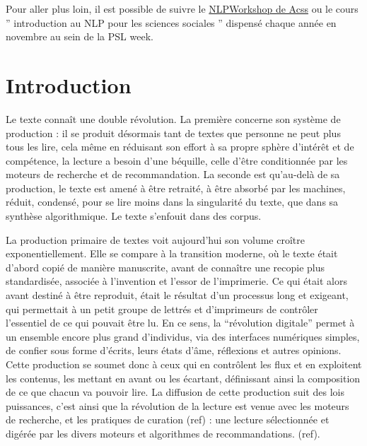 \documentclass[
  letterpaper,
  DIV=11,
  numbers=noendperiod]{scrreprt}
\begin{document}
Pour aller plus loin, il est possible de suivre le
\href{https://acss-dig.psl.eu/fr/seminaires/nlp}{NLPWorkshop de Acss} ou
le cours '' introduction au NLP pour les sciences sociales '' dispensé
chaque année en novembre au sein de la PSL week.


\chapter{Introduction}\label{introduction}

Le texte connaît une double révolution. La première concerne son système
de production : il se produit désormais tant de textes que personne ne
peut plus tous les lire, cela même en réduisant son effort à sa propre
sphère d'intérêt et de compétence, la lecture a besoin d'une béquille,
celle d'être conditionnée par les moteurs de recherche et de
recommandation. La seconde est qu'au-delà de sa production, le texte est
amené à être retraité, à être absorbé par les machines, réduit,
condensé, pour se lire moins dans la singularité du texte, que dans sa
synthèse algorithmique. Le texte s'enfouit dans des corpus.

La production primaire de textes voit aujourd'hui son volume croître
exponentiellement. Elle se compare à la transition moderne, où le texte
était d'abord copié de manière manuscrite, avant de connaître une
recopie plus standardisée, associée à l'invention et l'essor de
l'imprimerie. Ce qui était alors avant destiné à être reproduit, était
le résultat d'un processus long et exigeant, qui permettait à un petit
groupe de lettrés et d'imprimeurs de contrôler l'essentiel de ce qui
pouvait être lu. En ce sens, la ``révolution digitale'' permet à un
ensemble encore plus grand d'individus, via des interfaces numériques
simples, de confier sous forme d'écrits, leurs états d'âme, réflexions
et autres opinions. Cette production se soumet donc à ceux qui en
contrôlent les flux et en exploitent les contenus, les mettant en avant
ou les écartant, définissant ainsi la composition de ce que chacun va
pouvoir lire. La diffusion de cette production suit des lois puissances,
c'est ainsi que la révolution de la lecture est venue avec les moteurs
de recherche, et les pratiques de curation (ref) : une lecture
sélectionnée et digérée par les divers moteurs et algorithmes de
recommandations. (ref).
\end{document}
